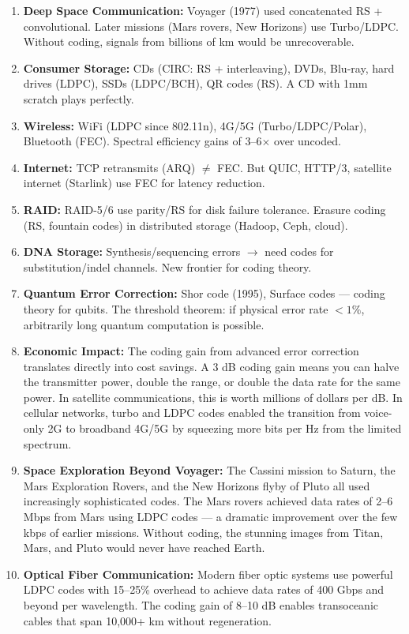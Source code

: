 \begin{enumerate}
\item \textbf{Deep Space Communication:} Voyager (1977) used concatenated RS + convolutional. Later missions (Mars rovers, New Horizons) use Turbo/LDPC. Without coding, signals from billions of km would be unrecoverable.

\item \textbf{Consumer Storage:} CDs (CIRC: RS + interleaving), DVDs, Blu-ray, hard drives (LDPC), SSDs (LDPC/BCH), QR codes (RS). A CD with 1mm scratch plays perfectly.

\item \textbf{Wireless:} WiFi (LDPC since 802.11n), 4G/5G (Turbo/LDPC/Polar), Bluetooth (FEC). Spectral efficiency gains of 3--6$\times$ over uncoded.

\item \textbf{Internet:} TCP retransmits (ARQ) $\neq$ FEC. But QUIC, HTTP/3, satellite internet (Starlink) use FEC for latency reduction.

\item \textbf{RAID:} RAID-5/6 use parity/RS for disk failure tolerance. Erasure coding (RS, fountain codes) in distributed storage (Hadoop, Ceph, cloud).

\item \textbf{DNA Storage:} Synthesis/sequencing errors $\to$ need codes for substitution/indel channels. New frontier for coding theory.

\item \textbf{Quantum Error Correction:} Shor code (1995), Surface codes — coding theory for qubits. The threshold theorem: if physical error rate $< 1\%$, arbitrarily long quantum computation is possible.

\item \textbf{Economic Impact:} The coding gain from advanced error correction translates directly into cost savings. A 3 dB coding gain means you can halve the transmitter power, double the range, or double the data rate for the same power. In satellite communications, this is worth millions of dollars per dB. In cellular networks, turbo and LDPC codes enabled the transition from voice-only 2G to broadband 4G/5G by squeezing more bits per Hz from the limited spectrum.

\item \textbf{Space Exploration Beyond Voyager:} The Cassini mission to Saturn, the Mars Exploration Rovers, and the New Horizons flyby of Pluto all used increasingly sophisticated codes. The Mars rovers achieved data rates of 2--6 Mbps from Mars using LDPC codes — a dramatic improvement over the few kbps of earlier missions. Without coding, the stunning images from Titan, Mars, and Pluto would never have reached Earth.

\item \textbf{Optical Fiber Communication:} Modern fiber optic systems use powerful LDPC codes with 15--25\% overhead to achieve data rates of 400 Gbps and beyond per wavelength. The coding gain of 8--10 dB enables transoceanic cables that span 10,000+ km without regeneration.
\end{enumerate}

